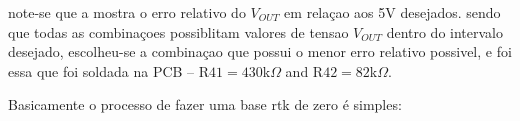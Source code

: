 

note-se que a
mostra o erro relativo do $V_{OUT}$ em relaçao aos 5V desejados. sendo que todas as combinaçoes possiblitam valores de tensao $V_{OUT}$ dentro do intervalo desejado, escolheu-se a combinaçao que possui o menor erro relativo possivel, e foi essa que foi soldada na PCB -- R$41=430$k$\Omega$ and R$42=82$k$\Omega$.

Basicamente o processo de fazer uma base rtk de zero é simples:
